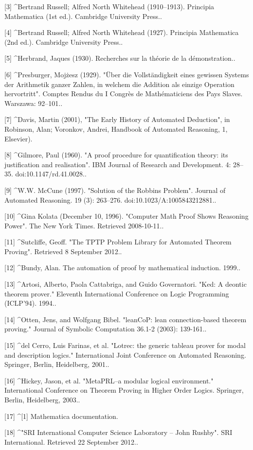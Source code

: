 [3]
^Bertrand Russell; Alfred North Whitehead (1910–1913). Principia Mathematica (1st ed.). Cambridge University Press..

[4]
^Bertrand Russell; Alfred North Whitehead (1927). Principia Mathematica (2nd ed.). Cambridge University Press..

[5]
^Herbrand, Jaques (1930). Recherches sur la théorie de la démonstration..

[6]
^Presburger, Mojżesz (1929). "Über die Vollständigkeit eines gewissen Systems der Arithmetik ganzer Zahlen, in welchem die Addition als einzige Operation hervortritt". Comptes Rendus du I Congrès de Mathématiciens des Pays Slaves. 
Warszawa: 92–101..

[7]
^Davis, Martin (2001), "The Early History of Automated Deduction", in Robinson, Alan; Voronkov, Andrei, Handbook of Automated Reasoning, 1, Elsevier).

[8]
^Gilmore, Paul (1960). "A proof procedure for quantification theory: its justification and realisation". IBM Journal of Research and Development. 4: 28–35. doi:10.1147/rd.41.0028..

[9]
^W.W. McCune (1997). "Solution of the Robbins Problem". Journal of Automated Reasoning. 19 (3): 263–276. doi:10.1023/A:1005843212881..

[10]
^Gina Kolata (December 10, 1996). "Computer Math Proof Shows Reasoning Power". The New York Times. Retrieved 2008-10-11..

[11]
^Sutcliffe, Geoff. "The TPTP Problem Library for Automated Theorem Proving". Retrieved 8 September 2012..

[12]
^Bundy, Alan. The automation of proof by mathematical induction. 1999..

[13]
^Artosi, Alberto, Paola Cattabriga, and Guido Governatori. "Ked: A deontic theorem prover." Eleventh International Conference on Logic Programming (ICLP’94). 1994..

[14]
^Otten, Jens, and Wolfgang Bibel. "leanCoP: lean connection-based theorem proving." Journal of Symbolic Computation 36.1-2 (2003): 139-161..

[15]
^del Cerro, Luis Farinas, et al. "Lotrec: the generic tableau prover for modal and description logics." International Joint Conference on Automated Reasoning. Springer, Berlin, Heidelberg, 2001..

[16]
^Hickey, Jason, et al. "MetaPRL–a modular logical environment." International Conference on Theorem Proving in Higher Order Logics. Springer, Berlin, Heidelberg, 2003..

[17]
^[1] Mathematica documentation.

[18]
^"SRI International Computer Science Laboratory – John Rushby". SRI International. Retrieved 22 September 2012..

